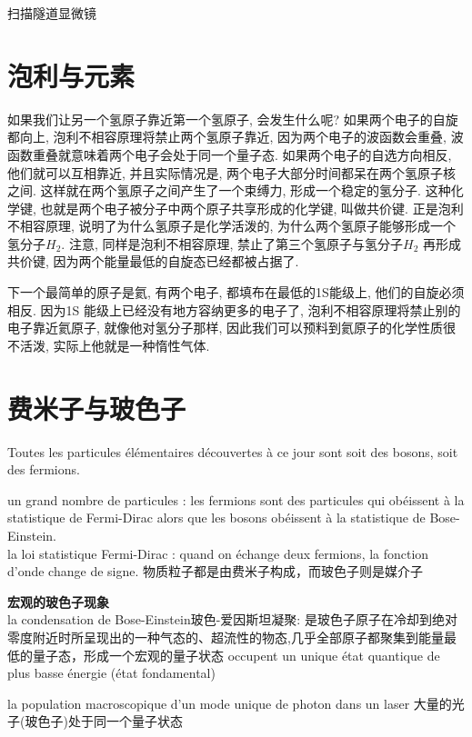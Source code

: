 \documentclass[openany]{book}
\begin{document}
扫描隧道显微镜

\section{泡利与元素}
如果我们让另一个氢原子靠近第一个氢原子, 会发生什么呢? 如果两个电子的自旋都向上, 泡利不相容原理将禁止两个氢原子靠近, 因为两个电子的波函数会重叠, 波函数重叠就意味着两个电子会处于同一个量子态. 如果两个电子的自选方向相反, 他们就可以互相靠近, 并且实际情况是, 两个电子大部分时间都呆在两个氢原子核之间. 这样就在两个氢原子之间产生了一个束缚力, 形成一个稳定的氢分子. 这种化学键, 也就是两个电子被分子中两个原子共享形成的化学键, 叫做共价键. 正是泡利不相容原理, 说明了为什么氢原子是化学活泼的, 为什么两个氢原子能够形成一个氢分子$H_2$. 注意, 同样是泡利不相容原理, 禁止了第三个氢原子与氢分子$H_2$ 再形成共价键, 因为两个能量最低的自旋态已经都被占据了.\par
下一个最简单的原子是氦, 有两个电子, 都填布在最低的1S能级上, 他们的自旋必须相反. 因为1S 能级上已经没有地方容纳更多的电子了, 泡利不相容原理将禁止别的电子靠近氦原子, 就像他对氢分子那样, 因此我们可以预料到氦原子的化学性质很不活泼, 实际上他就是一种惰性气体.

\section{费米子与玻色子}
Toutes les particules \'el\'ementaires d\'ecouvertes \`a ce jour sont soit des bosons, soit des fermions.\par

un grand nombre de particules : les fermions sont des particules qui ob\'eissent \`a la statistique de Fermi-Dirac alors que les bosons ob\'eissent \`a la statistique de Bose-Einstein.\\
la loi statistique Fermi-Dirac : quand on \'echange deux fermions, la fonction d'onde change de signe.
物质粒子都是由费米子构成，而玻色子则是媒介子

\textbf{宏观的玻色子现象}\\
la condensation de Bose-Einstein玻色-爱因斯坦凝聚: 是玻色子原子在冷却到绝对零度附近时所呈现出的一种气态的、超流性的物态,几乎全部原子都聚集到能量最低的量子态，形成一个宏观的量子状态  occupent un unique \'etat quantique de plus basse \'energie (\'etat fondamental)\par
la population macroscopique d'un mode unique de photon dans un laser
大量的光子(玻色子)处于同一个量子状态 \par
\end{document}
